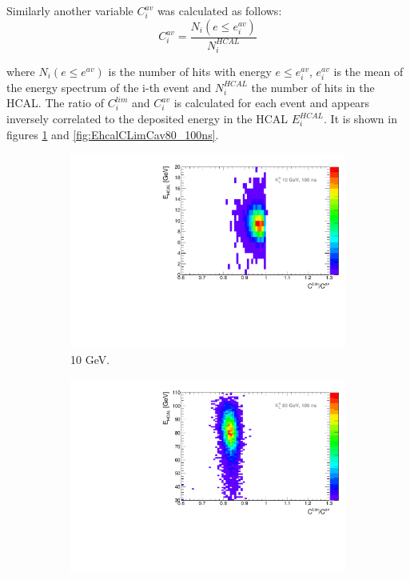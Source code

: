 Similarly another variable $C_{i}^{av}$ was calculated as follows:
\begin{equation}
  C_{i}^{av} = \frac{N_{i}(e \leq e_{i}^{av})}{N_{i}^{HCAL}}
\end{equation}

where $N_{i}(e \leq e^{av})$ is the number of hits with energy $e \leq e_{i}^{av}$, $e_{i}^{av}$ is the mean of the energy spectrum of the i-th event and $N_{i}^{HCAL}$ the number of hits in the HCAL. The ratio of $C_{i}^{lim}$ and $C_{i}^{av}$ is calculated for each event and appears inversely correlated to the deposited energy in the HCAL $E_i^{HCAL}$. It is shown in figures \ref{fig:EhcalCLimCav10_100ns} and \ref{fig:EhcalCLimCav80_100ns}.

\begin{figure}[htbp!]
  \centering
  \begin{subfigure}[t]{0.45\textwidth}
    \centering
    \includegraphics[width=1\linewidth]{../Thesis_Plots/ILD/AdditionalPlots/Plots/EhcalCLimCav_100ns_10GeV.pdf}
    \caption{10 GeV.} \label{fig:EhcalCLimCav10_100ns}
  \end{subfigure}
  \hfill
  \begin{subfigure}[t]{0.45\textwidth}
    \centering
    \includegraphics[width=1\linewidth]{../Thesis_Plots/ILD/AdditionalPlots/Plots/EhcalCLimCav_100ns_80GeV.pdf}

\end{subfigure}
\end{figure}
